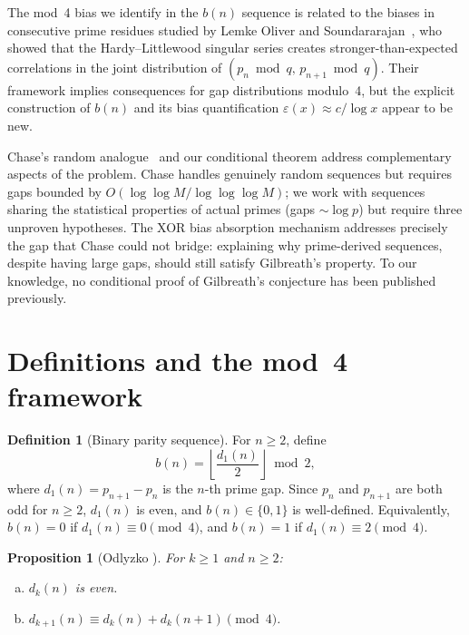 \documentclass[11pt, a4paper]{amsart}
\theoremstyle{plain}
\newtheorem{proposition}[theorem]{Proposition}
\theoremstyle{definition}
\newtheorem{definition}[theorem]{Definition}
\begin{document}
The mod~4 bias we identify in the $b(n)$ sequence is related to the biases in consecutive
prime residues studied by Lemke Oliver and Soundararajan~\cite{LOS2016}, who showed
that the Hardy--Littlewood singular series creates stronger-than-expected correlations
in the joint distribution of $(p_n \bmod q,\, p_{n+1} \bmod q)$. Their framework
implies consequences for gap distributions modulo~4, but the explicit construction of
$b(n)$ and its bias quantification $\varepsilon(x) \approx c/\log x$ appear to be new.

Chase's random analogue~\cite{Chase2020} and our conditional theorem address complementary
aspects of the problem. Chase handles genuinely random sequences but requires gaps
bounded by $O(\log\log M / \log\log\log M)$; we work with sequences sharing the
statistical properties of actual primes (gaps $\sim \log p$) but require three unproven
hypotheses. The XOR bias absorption mechanism addresses precisely the gap that Chase
could not bridge: explaining why prime-derived sequences, despite having large gaps,
should still satisfy Gilbreath's property. To our knowledge, no conditional proof of
Gilbreath's conjecture has been published previously.

\section{Definitions and the mod~4 framework}
\label{sec:mod4}

\begin{definition}[Binary parity sequence]\label{def:b-sequence}
For $n \ge 2$, define
\[
b(n) = \left\lfloor \frac{d_1(n)}{2} \right\rfloor \bmod 2,
\]
where $d_1(n) = p_{n+1} - p_n$ is the $n$-th prime gap. Since $p_n$ and $p_{n+1}$ are both odd for $n \ge 2$, $d_1(n)$ is even, 
and $b(n) \in \{0, 1\}$ is well-defined. Equivalently, $b(n) = 0$ if $d_1(n) \equiv 0 \pmod{4}$, and $b(n) = 1$ if $d_1(n) \equiv 2 \pmod{4}$.
\end{definition}

\begin{proposition}[Odlyzko {\cite[Section~2]{Odlyzko1993}}]\label{prop:mod4}
For $k \ge 1$ and $n \ge 2$:
\begin{enumerate}[(a)]
\item $d_k(n)$ is even.
\item $d_{k+1}(n) \equiv d_k(n) + d_k(n+1) \pmod{4}$.
\end{enumerate}
\end{proposition}
\end{document}
